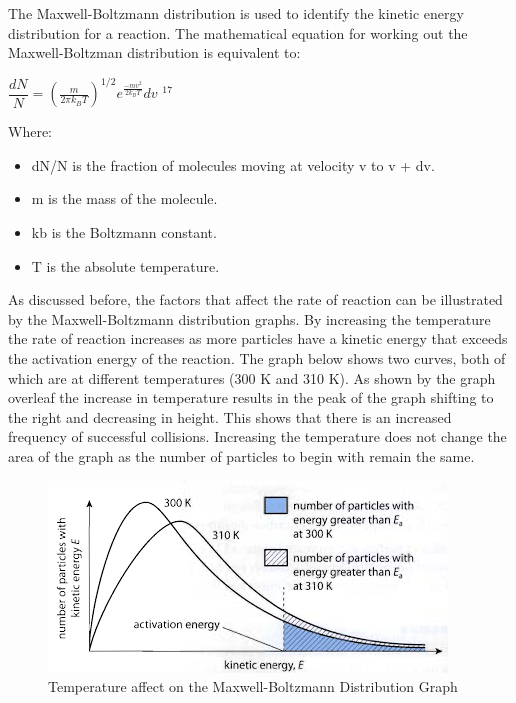 The Maxwell-Boltzmann distribution is used to identify the kinetic energy distribution for a reaction. The mathematical equation for working out the Maxwell-Boltzman distribution is equivalent to:

$\dfrac{dN}{N}= \left(\frac{m}{2\pi k_BT} \right)^{1/2}e^{\frac{-mv^2}{2k_BT}}dv$ $^{17}$

Where:

\begin{itemize}
\item dN/N is the fraction of molecules moving at velocity v to v + dv.
\item m is the mass of the molecule.
\item kb is the Boltzmann constant.
\item T is the absolute temperature.
\end{itemize}

As discussed before, the factors that affect the rate of reaction can be illustrated by the Maxwell-Boltzmann distribution graphs. By increasing the temperature the rate of reaction increases as more particles have a kinetic energy that exceeds the activation energy of the reaction. The graph below shows two curves, both of which are at different temperatures (300 K and 310 K). As shown by the graph overleaf the increase in temperature results in the peak of the graph shifting to the right and decreasing in height. This shows that there is an increased frequency of  successful collisions. Increasing the temperature does not change the area of the graph as the number of particles to begin with remain the same.

\begin{figure}[H]
    \includegraphics[width=\textwidth]{./Planning/Images/TemperatureMaxwell.png}
    \caption{Temperature affect on the Maxwell-Boltzmann Distribution Graph} \label{fig:TemperatureMaxwell}
\end{figure}


